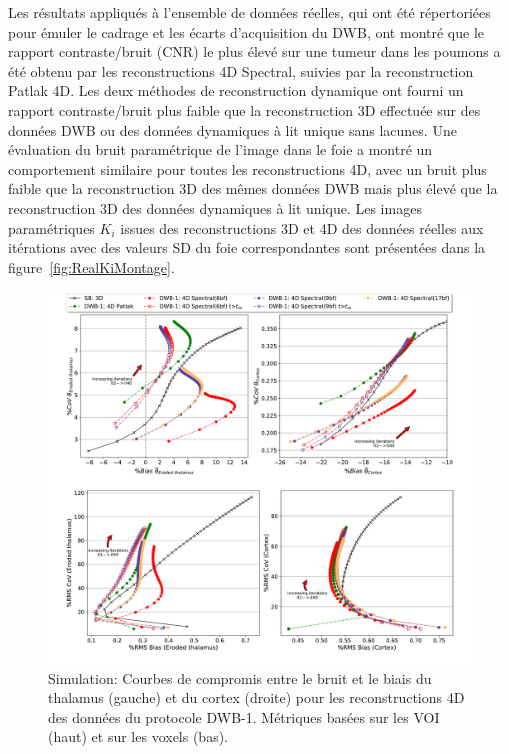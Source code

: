 Les résultats appliqués à l'ensemble de données réelles, qui ont été répertoriées pour émuler le cadrage et les écarts d'acquisition du DWB, ont montré que le rapport contraste/bruit (CNR) le plus élevé sur une tumeur dans les poumons a été obtenu par les reconstructions 4D Spectral, suivies par la reconstruction Patlak 4D. Les deux méthodes de reconstruction dynamique ont fourni un rapport contraste/bruit plus faible que la reconstruction 3D effectuée sur des données DWB ou des données dynamiques à lit unique sans lacunes. Une évaluation du bruit paramétrique de l'image dans le foie a montré un comportement similaire pour toutes les reconstructions 4D, avec un bruit plus faible que la reconstruction 3D des mêmes données DWB mais plus élevé que la reconstruction 3D des données dynamiques à lit unique.
Les images paramétriques $K_i$ issues des reconstructions 3D et 4D des données réelles aux itérations avec des valeurs SD du foie correspondantes sont présentées dans la figure~\ref{fig:RealKiMontage}. 
%
\begin{figure} [ht!]
\centering
\includegraphics[scale=0.42,angle=0]{./Resume/3_2.pdf}
\caption{Simulation: Courbes de compromis entre le bruit et le biais du thalamus (gauche) et du cortex (droite) pour les reconstructions 4D des données du protocole DWB-1. Métriques basées sur les VOI (haut) et sur les voxels (bas).}
\label{fig:3_2_DynamicModels}
\end{figure} 
%
